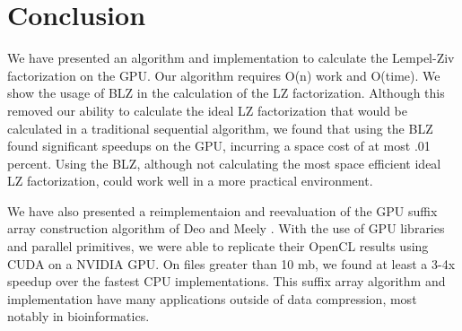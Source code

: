 \chapter{Conclusion}

We have presented an algorithm and implementation to calculate the Lempel-Ziv factorization on the GPU.
Our algorithm requires O(n) work and O(time).
We show the usage of BLZ in the calculation of the LZ factorization.
Although this removed our ability to calculate the ideal LZ factorization that would be calculated in a traditional sequential algorithm, we found that using the BLZ found significant speedups on the GPU, incurring a space cost of at most .01 percent.
Using the BLZ, although not calculating the most space efficient ideal LZ factorization, could work well in a more practical environment.

We have also presented a reimplementaion and reevaluation of the GPU suffix array construction algorithm of Deo and Meely \cite{}.
With the use of GPU libraries and parallel primitives, we were able to replicate their OpenCL results using CUDA on a NVIDIA GPU.
On files greater than 10 mb, we found at least a 3-4x speedup over the fastest CPU implementations.
This suffix array algorithm and implementation have many applications outside of data compression, most notably in bioinformatics.
